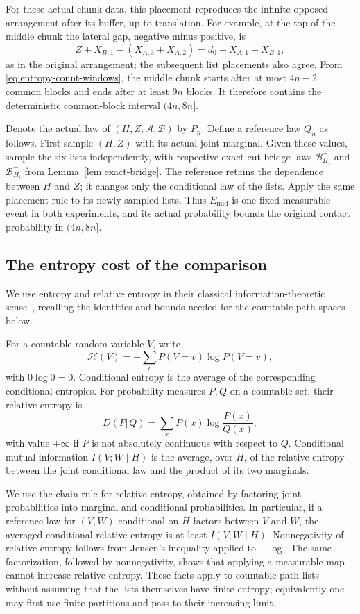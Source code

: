 For these actual chunk data, this placement reproduces the infinite
opposed arrangement after its buffer, up to translation.  For example,
at the top of the middle chunk the lateral gap, negative minus positive, is
\[
 Z+X_{B,1}-(X_{A,3}+X_{A,2})
   =d_0+X_{A,1}+X_{B,1},
\]
as in the original arrangement; the subsequent list placements also
agree.  From \eqref{eq:entropy-count-windows}, the middle chunk starts
after at most $4n-2$ common blocks and ends after at least $9n$ blocks.
It therefore contains the deterministic common-block interval
$(4n,8n]$.

Denote the actual law of $(H,Z,\mathcal A,\mathcal B)$ by $P_n$.
Define a reference law $Q_n$ as follows.  First sample $(H,Z)$ with its
actual joint marginal.  Given these values, sample the six lists
independently, with respective exact-cut bridge laws
$\mathcal B_{H_i}^+$ and $\mathcal B_{H_i}^-$ from
Lemma~\ref{lem:exact-bridge}.  The reference retains the dependence
between $H$ and $Z$; it changes only the conditional law of the lists.
Apply the same placement rule to its newly sampled lists.  Thus $E_{\mathrm{mid}}$ is one fixed
measurable event in both experiments, and its actual probability
bounds the original contact probability in $(4n,8n]$.

\subsection{The entropy cost of the comparison}

We use entropy and relative entropy in their classical information-theoretic
sense~\cite{Shannon1948,KullbackLeibler1951}, recalling the identities and
bounds needed for the countable path spaces below.

For a countable random variable $V$, write
\[
 \mathcal H(V)=-\sum_v P(V=v)\log P(V=v),
\]
with $0\log0=0$.  Conditional entropy is the average of the corresponding
conditional entropies.  For probability measures $P,Q$ on a countable set,
their relative entropy is
\[
 D(P\Vert Q)=\sum_x P(x)\log\frac{P(x)}{Q(x)},
\]
with value $+\infty$ if $P$ is not absolutely continuous with respect to
$Q$.  Conditional mutual information $I(V;W\mid H)$ is the average,
over $H$, of the relative entropy between the joint conditional law and
the product of its two marginals.

We use the chain rule for relative entropy, obtained by factoring joint
probabilities into marginal and conditional probabilities.  In particular,
if a reference law for $(V,W)$ conditional on $H$ factors between $V$ and
$W$, the averaged conditional relative entropy is at least
$I(V;W\mid H)$.  Nonnegativity of relative entropy follows from Jensen's
inequality applied to $-\log$.  The same factorization, followed by
nonnegativity, shows that applying a measurable map cannot increase
relative entropy.  These facts apply to countable path lists without
assuming that the lists themselves have finite entropy; equivalently one
may first use finite partitions and pass to their increasing limit.


